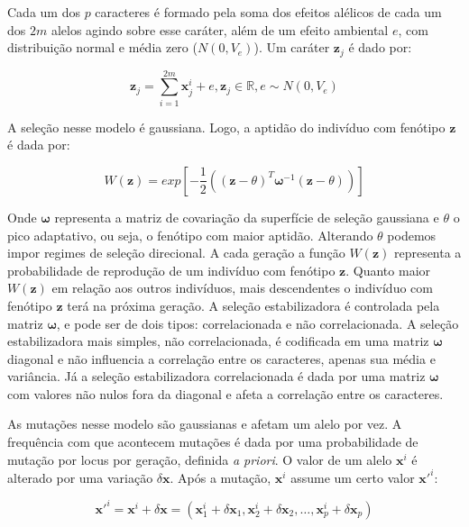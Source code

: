 Cada um dos $p$ caracteres é formado pela soma dos efeitos alélicos de
cada um dos $2m$ alelos agindo sobre esse caráter, além de um efeito
ambiental $e$, com distribuição normal e média zero ($N(0,V_e)$).
Um caráter $\mathbf{z}_j$ é dado
por:

\begin{equation}
    \mathbf{z}_j = \sum_{i=1}^{2m} \mathbf{x}^i_j + e, \mathbf{z}_j \in \mathbb{R}, e \sim N(0, V_e)
\end{equation}

A seleção nesse modelo é gaussiana.
Logo, a aptidão do indivíduo com fenótipo $\mathbf{z}$ é dada por:

\begin{equation}
W(\mathbf{z}) = exp \left[-\frac{1}{2} ((\mathbf{z}-\theta)^T \pmb{\omega}^{-1} (\mathbf{z}-\theta))\right] 
\label{selecao}
\end{equation}

Onde $\pmb{\omega}$ representa a matriz de covariação da superfície de seleção
gaussiana e $\theta$ o pico adaptativo, ou seja, o fenótipo com maior
aptidão.
Alterando $\theta$ podemos impor regimes de seleção direcional.
A cada geração a função $W(\mathbf{z})$ representa a probabilidade de reprodução
de um indivíduo com fenótipo $\mathbf{z}$.
Quanto maior $W(\mathbf{z})$ em relação aos outros indivíduos, mais descendentes
o indivíduo com fenótipo $\mathbf{z}$ terá na próxima geração.
A seleção estabilizadora é controlada pela matriz $\pmb{\omega}$, e
pode ser de dois tipos: correlacionada e não correlacionada.
A seleção estabilizadora mais simples, não correlacionada, é codificada
em uma matriz $\pmb{\omega}$ diagonal e não influencia a correlação entre os
caracteres, apenas sua média e variância.
Já a seleção estabilizadora correlacionada é dada por uma matriz
$\pmb{\omega}$ com valores não nulos fora da diagonal e afeta a correlação
entre os caracteres.

As mutações nesse modelo são gaussianas e afetam um alelo por vez.
A frequência com que acontecem mutações é dada por uma probabilidade de
mutação por locus por geração, definida {\it a priori}.
O valor de um alelo $\mathbf{x}^i$ é alterado por uma variação $ \delta \mathbf{x}$.
Após a mutação, $\mathbf{x}^i$ assume um certo valor $\mathbf{x}'^i$:

\begin{equation}
\mathbf{x}'^i = \mathbf{x}^i + \delta \mathbf{x} = ( \mathbf{x}^i_1 + \delta \mathbf{x}_1, \mathbf{x}^i_2 + \delta \mathbf{x}_2,\ldots, \mathbf{x}^i_p + \delta \mathbf{x}_p)
\end{equation}

